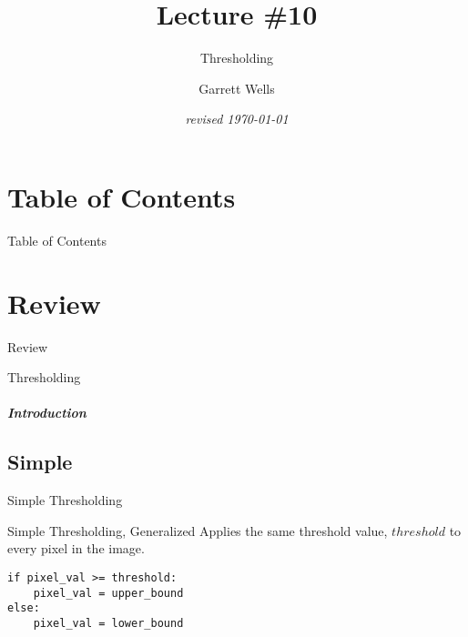 \documentclass[aspectratio=169]{beamer}
\title{Lecture \#10}
\subtitle{Thresholding}
\date{\textit{revised \today}}
\author{Garrett Wells}
\begin{document}
\begin{frame}
    \titlepage
\end{frame}

\section{Table of Contents}
\begin{frame}[allowframebreaks]{Table of Contents}
    \tableofcontents
\end{frame}

\section{Review}
\begin{frame}{Review}
\end{frame}

\begin{frame}{Thresholding}
    \framesubtitle{\textit{Introduction\dlots}}
    \centering
\end{frame}


\subsection{Simple}
\begin{frame}[fragile]{Simple Thresholding}
    \begin{block}{Simple Thresholding, Generalized}     
        Applies the same threshold value, $threshold$ to every pixel in the image. 
        \vspace{0.5cm}
        \begin{verbatim}
if pixel_val >= threshold:
    pixel_val = upper_bound
else:
    pixel_val = lower_bound
        \end{verbatim}
    \end{block}

\end{frame}
\end{document}
